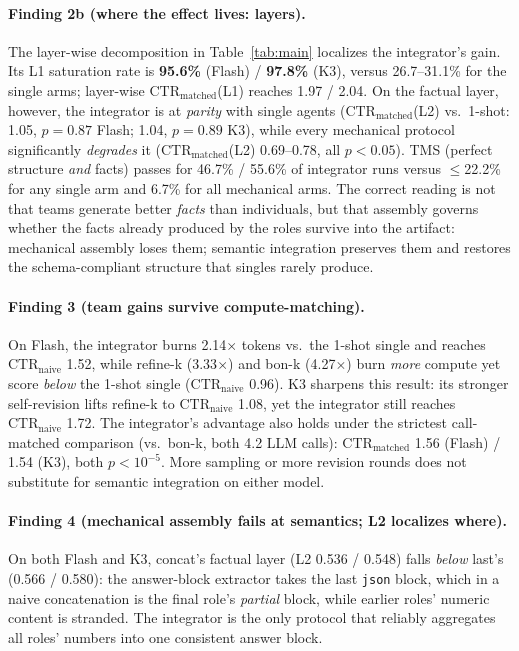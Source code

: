 \documentclass[sigconf,anonymous]{aamas}
\newcommand{\ctrn}{\mathrm{CTR}_{\text{naive}}}
\newcommand{\ctrm}{\mathrm{CTR}_{\text{matched}}}
\newcommand{\code}[1]{\texttt{#1}}
\begin{document}
\paragraph{Finding 2b (where the effect lives: layers).} The layer-wise decomposition in Table~\ref{tab:main} localizes the integrator's gain. Its L1 saturation rate is \textbf{95.6\%} (Flash) / \textbf{97.8\%} (K3), versus 26.7--31.1\% for the single arms; layer-wise $\ctrm$(L1) reaches 1.97 / 2.04. On the factual layer, however, the integrator is at \emph{parity} with single agents ($\ctrm$(L2) vs.\ 1-shot: 1.05, $p=0.87$ Flash; 1.04, $p=0.89$ K3), while every mechanical protocol significantly \emph{degrades} it ($\ctrm$(L2) 0.69--0.78, all $p<0.05$). TMS (perfect structure \emph{and} facts) passes for 46.7\% / 55.6\% of integrator runs versus $\le$22.2\% for any single arm and 6.7\% for all mechanical arms. The correct reading is not that teams generate better \emph{facts} than individuals, but that assembly governs whether the facts already produced by the roles survive into the artifact: mechanical assembly loses them; semantic integration preserves them and restores the schema-compliant structure that singles rarely produce.

\paragraph{Finding 3 (team gains survive compute-matching).} On Flash, the integrator burns 2.14$\times$ tokens vs.\ the 1-shot single and reaches $\ctrn$ 1.52, while refine-k (3.33$\times$) and bon-k (4.27$\times$) burn \emph{more} compute yet score \emph{below} the 1-shot single ($\ctrn$ 0.96). K3 sharpens this result: its stronger self-revision lifts refine-k to $\ctrn$ 1.08, yet the integrator still reaches $\ctrn$ 1.72. The integrator's advantage also holds under the strictest call-matched comparison (vs.\ bon-k, both 4.2 LLM calls): $\ctrm$ 1.56 (Flash) / 1.54 (K3), both $p<10^{-5}$. More sampling or more revision rounds does not substitute for semantic integration on either model.

\paragraph{Finding 4 (mechanical assembly fails at semantics; L2 localizes where).} On both Flash and K3, concat's factual layer (L2 0.536 / 0.548) falls \emph{below} last's (0.566 / 0.580): the answer-block extractor takes the last \code{json} block, which in a naive concatenation is the final role's \emph{partial} block, while earlier roles' numeric content is stranded. The integrator is the only protocol that reliably aggregates all roles' numbers into one consistent answer block.
\end{document}
